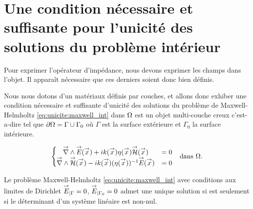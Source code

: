 \section{Une condition nécessaire et suffisante pour l'unicité des solutions du problème intérieur}

Pour exprimer l'opérateur d'impédance, nous devons exprimer les champs dans l'objet. Il apparaît nécessaire que ces derniers soient donc bien définis.

Nous nous dotons d'un matériaux définis par couches, et allons donc exhiber une condition nécessaire et suffisante d'unicité des solutions du problème de Maxwell-Helmholtz  \eqref{eq:unicite:maxwell_int} dans \(\Omega\) est un objet multi-couche creux c'est-a-dire tel que \(\partial \Omega = \Gamma \cup \Gamma_0\) où \(\Gamma\) est la surface extérieure et \(\Gamma_0\) la surface intérieure.

\begin{align}
\left\lbrace
  \begin{matrix}
    {\overset{\rightarrow}{\nabla}}\wedge {\overset{\rightarrow}{E}}({\overset{\rightarrow}{x}}) + i k({\overset{\rightarrow}{x}})\eta({\overset{\rightarrow}{x}}) {\overset{\rightarrow}{\mathcal{H}}}({\overset{\rightarrow}{x}}) &= 0
    \\
    {\overset{\rightarrow}{\nabla}}\wedge {\overset{\rightarrow}{\mathcal{H}}}({\overset{\rightarrow}{x}}) - i k({\overset{\rightarrow}{x}})(\eta({\overset{\rightarrow}{x}}))^{-1} {\overset{\rightarrow}{E}}({\overset{\rightarrow}{x}}) &= 0
  \end{matrix}
  \right. && \text{dans \(\Omega\).}
  \label{eq:unicite:maxwell_int}
\end{align}

\begin{prop}
  Le problème Maxwell-Helmholtz \eqref{eq:unicite:maxwell_int} avec conditions aux limites de Dirichlet \({\overset{\rightarrow}{E}}_{|\Gamma} = 0\), \({\overset{\rightarrow}{E}}_{|\Gamma_0} = 0\) admet une unique solution si est seulement si le déterminant d'un système linéaire est non-nul.
\end{prop}


